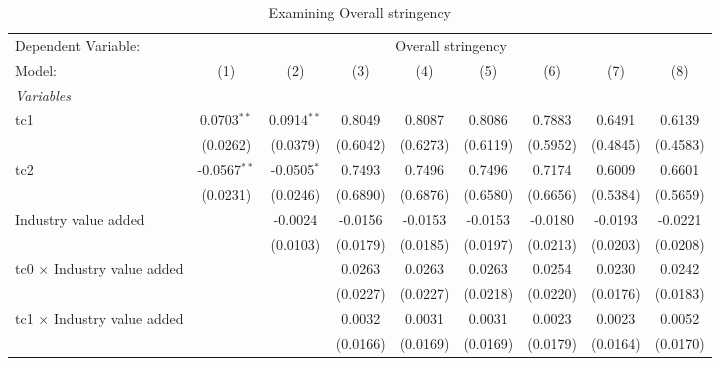 
\begin{table}[htbp]
   \caption{Examining Overall stringency}
   \centering
   \begin{tabular}{lcccccccc}
      \tabularnewline \midrule \midrule
      Dependent Variable: & \multicolumn{8}{c}{Overall stringency}\\
      Model:                                  & (1)            & (2)           & (3)      & (4)      & (5)                    & (6)                    & (7)      & (8)\\  
      \midrule
      \emph{Variables}\\
      tc1                                     & 0.0703$^{**}$  & 0.0914$^{**}$ & 0.8049   & 0.8087   & 0.8086                 & 0.7883                 & 0.6491   & 0.6139\\   
                                              & (0.0262)       & (0.0379)      & (0.6042) & (0.6273) & (0.6119)               & (0.5952)               & (0.4845) & (0.4583)\\   
      tc2                                     & -0.0567$^{**}$ & -0.0505$^{*}$ & 0.7493   & 0.7496   & 0.7496                 & 0.7174                 & 0.6009   & 0.6601\\   
                                              & (0.0231)       & (0.0246)      & (0.6890) & (0.6876) & (0.6580)               & (0.6656)               & (0.5384) & (0.5659)\\   
      Industry value added                    &                & -0.0024       & -0.0156  & -0.0153  & -0.0153                & -0.0180                & -0.0193  & -0.0221\\   
                                              &                & (0.0103)      & (0.0179) & (0.0185) & (0.0197)               & (0.0213)               & (0.0203) & (0.0208)\\   
      tc0 $\times$ Industry value added       &                &               & 0.0263   & 0.0263   & 0.0263                 & 0.0254                 & 0.0230   & 0.0242\\   
                                              &                &               & (0.0227) & (0.0227) & (0.0218)               & (0.0220)               & (0.0176) & (0.0183)\\   
      tc1 $\times$ Industry value added       &                &               & 0.0032   & 0.0031   & 0.0031                 & 0.0023                 & 0.0023   & 0.0052\\   
                                              &                &               & (0.0166) & (0.0169) & (0.0169)               & (0.0179)               & (0.0164) & (0.0170)\\   

\end{tabular}
\end{table}
